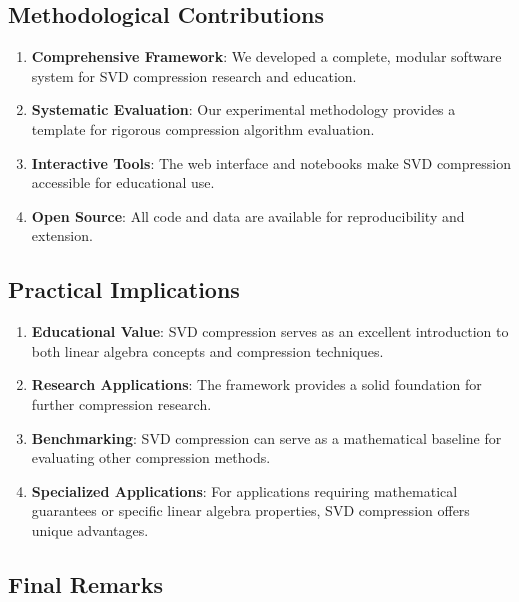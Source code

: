 \documentclass[12pt,a4paper]{article}
\begin{document}
\subsection{Methodological Contributions}

\begin{enumerate}
    \item \textbf{Comprehensive Framework}: We developed a complete, modular software system for SVD compression research and education.
    
    \item \textbf{Systematic Evaluation}: Our experimental methodology provides a template for rigorous compression algorithm evaluation.
    
    \item \textbf{Interactive Tools}: The web interface and notebooks make SVD compression accessible for educational use.
    
    \item \textbf{Open Source}: All code and data are available for reproducibility and extension.
\end{enumerate}

\subsection{Practical Implications}

\begin{enumerate}
    \item \textbf{Educational Value}: SVD compression serves as an excellent introduction to both linear algebra concepts and compression techniques.
    
    \item \textbf{Research Applications}: The framework provides a solid foundation for further compression research.
    
    \item \textbf{Benchmarking}: SVD compression can serve as a mathematical baseline for evaluating other compression methods.
    
    \item \textbf{Specialized Applications}: For applications requiring mathematical guarantees or specific linear algebra properties, SVD compression offers unique advantages.
\end{enumerate}

\subsection{Final Remarks}
\end{document}
